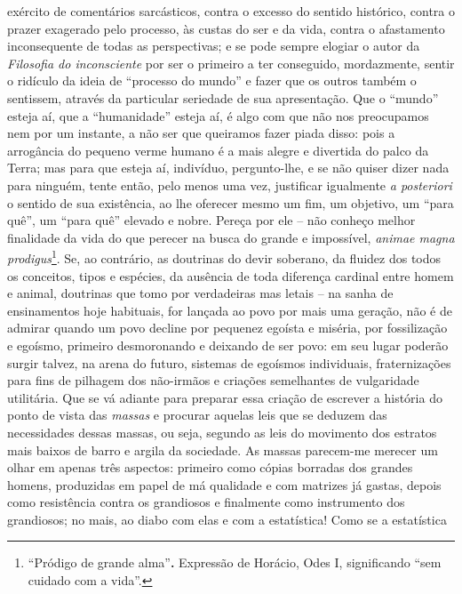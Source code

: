 \begin{enumerate}
\begin{enumerate}
    exército de comentários sarcásticos, contra o excesso do sentido
    histórico, contra o prazer exagerado pelo processo, às custas do ser
    e da vida, contra o afastamento inconsequente de todas as
    perspectivas; e se pode sempre elogiar o autor da \emph{Filosofia do
    inconsciente} por ser o primeiro a ter conseguido, mordazmente,
    sentir o ridículo da ideia de ``processo do mundo'' e fazer que os
    outros também o sentissem, através da particular seriedade de sua
    apresentação. Que o ``mundo'' esteja aí, que a ``humanidade'' esteja
    aí, é algo com que não nos preocupamos nem por um instante, a não
    ser que queiramos fazer piada disso: pois a arrogância do pequeno
    verme humano é a mais alegre e divertida do palco da Terra; mas para
    que esteja aí, indivíduo, pergunto-lhe, e se não quiser dizer nada
    para ninguém, tente então, pelo menos uma vez, justificar igualmente
    \emph{a posteriori} o sentido de sua existência, ao lhe oferecer
    mesmo um fim, um objetivo, um ``para quê'', um ``para quê'' elevado
    e nobre. Pereça por ele -- não conheço melhor finalidade da vida do
    que perecer na busca do grande e impossível, \emph{animae magna
    prodigus}\footnote{``Pródigo de grande alma''\textbf{.} Expressão de
      Horácio, Odes I, significando ``sem cuidado com a vida''.}. Se, ao
    contrário, as doutrinas do devir soberano, da fluidez dos todos os
    conceitos, tipos e espécies, da ausência de toda diferença cardinal
    entre homem e animal, doutrinas que tomo por verdadeiras mas letais
    -- na sanha de ensinamentos hoje habituais, for lançada ao povo por
    mais uma geração, não é de admirar quando um povo decline por
    pequenez egoísta e miséria, por fossilização e egoísmo, primeiro
    desmoronando e deixando de ser povo: em seu lugar poderão surgir
    talvez, na arena do futuro, sistemas de egoísmos individuais,
    fraternizações para fins de pilhagem dos não-irmãos e criações
    semelhantes de vulgaridade utilitária. Que se vá adiante para
    preparar essa criação de escrever a história do ponto de vista das
    \emph{massas} e procurar aquelas leis que se deduzem das
    necessidades dessas massas, ou seja, segundo as leis do movimento
    dos estratos mais baixos de barro e argila da sociedade. As massas
    parecem-me merecer um olhar em apenas três aspectos: primeiro como
    cópias borradas dos grandes homens, produzidas em papel de má
    qualidade e com matrizes já gastas, depois como resistência contra
    os grandiosos e finalmente como instrumento dos grandiosos; no mais,
    ao diabo com elas e com a estatística! Como se a estatística

\end{enumerate}
\end{enumerate}
